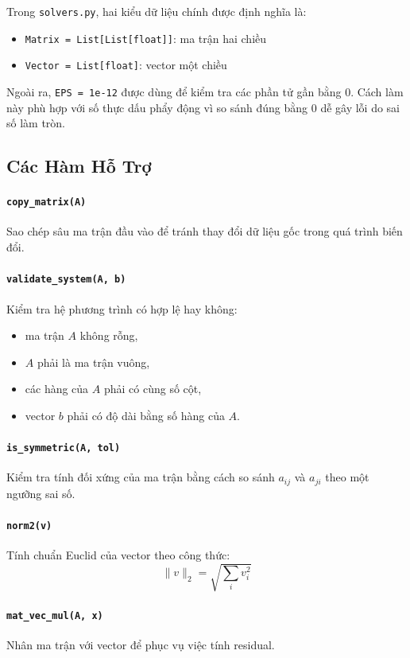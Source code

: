 \documentclass[12pt, a4paper, twoside]{article}
\begin{document}
Trong \texttt{solvers.py}, hai kiểu dữ liệu chính được định nghĩa là:
\begin{itemize}
    \item \texttt{Matrix = List[List[float]]}: ma trận hai chiều
    \item \texttt{Vector = List[float]}: vector một chiều
\end{itemize}

Ngoài ra, \texttt{EPS = 1e-12} được dùng để kiểm tra các phần tử gần bằng 0. Cách làm này phù hợp với số thực dấu phẩy động vì so sánh đúng bằng 0 dễ gây lỗi do sai số làm tròn.

\subsection{Các Hàm Hỗ Trợ}

\paragraph{\texttt{copy\_matrix(A)}}
Sao chép sâu ma trận đầu vào để tránh thay đổi dữ liệu gốc trong quá trình biến đổi.

\paragraph{\texttt{validate\_system(A, b)}}
Kiểm tra hệ phương trình có hợp lệ hay không:
\begin{itemize}
    \item ma trận $A$ không rỗng,
    \item $A$ phải là ma trận vuông,
    \item các hàng của $A$ phải có cùng số cột,
    \item vector $b$ phải có độ dài bằng số hàng của $A$.
\end{itemize}

\paragraph{\texttt{is\_symmetric(A, tol)}}
Kiểm tra tính đối xứng của ma trận bằng cách so sánh $a_{ij}$ và $a_{ji}$ theo một ngưỡng sai số.

\paragraph{\texttt{norm2(v)}}
Tính chuẩn Euclid của vector theo công thức:
\[
\|v\|_2 = \sqrt{\sum_i v_i^2}
\]

\paragraph{\texttt{mat\_vec\_mul(A, x)}}
Nhân ma trận với vector để phục vụ việc tính residual.
\end{document}
